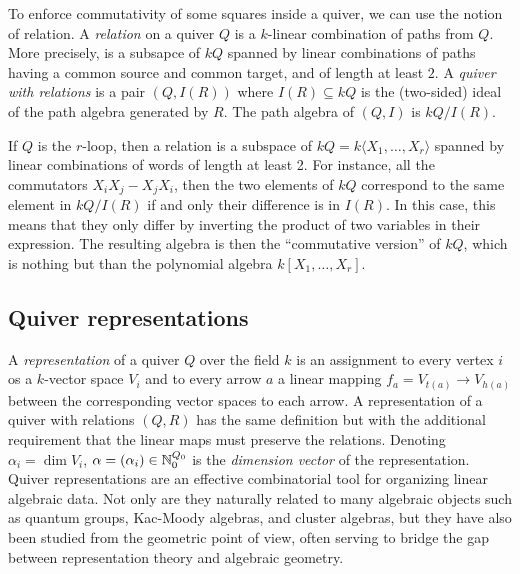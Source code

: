         To enforce commutativity of some squares inside a quiver, we can use the notion of relation. A \emph{relation} on a quiver $Q$ is a $k$-linear combination of paths from $Q$. More precisely, is a subsapce of $kQ$ spanned by linear combinations of paths having a common source and common target, and of length at least $2$. A \emph{quiver with relations} is a pair $(Q,I(R))$ where $I(R)\subseteq kQ$ is the (two-sided) ideal of the path algebra generated by $R$. The path algebra of $(Q,I)$ is $kQ/I(R)$. 
        
        \begin{examp*}
            If $Q$ is the $r$-loop, then a relation is a subspace of $kQ = k\langle X_1,\dots,X_r\rangle$ spanned by linear combinations of words of length at least 2. For instance, all the commutators $X_iX_j-X_jX_i$, then the two elements of $kQ$ correspond to the same element in $kQ/I(R)$ if and only their difference is in $I(R)$. In this case, this means that they only differ by inverting the product of two variables in their expression. The resulting algebra is then the ``commutative version'' of $kQ$, which is nothing but than the polynomial algebra $k[X_1,\dots,X_r]$.
        \end{examp*}

    \subsection{Quiver representations}

        A \emph{representation} of a quiver $Q$ over the field $k$ is an assignment to every vertex $i$ os a $k$-vector space $V_i$ and to every arrow $a$ a linear mapping $f_a=V_{t(a)}\to V_{h(a)}$ between the corresponding vector spaces to each arrow. A representation of a quiver with relations $(Q,R)$ has the same definition but with the additional requirement that the linear maps must preserve the relations\marker. Denoting $\alpha_i=\dim V_i$, $\alpha=(\alpha_i)\in\mathbb{N}^{Q_0}_0$ is the \emph{dimension vector} of the representation. Quiver representations are an effective combinatorial tool for organizing linear algebraic data. Not only are they naturally related to many algebraic objects such as quantum groups, Kac-Moody algebras, and cluster algebras, but they have also been studied from the geometric point of view, often serving to bridge the gap between representation theory and algebraic geometry. 
        
